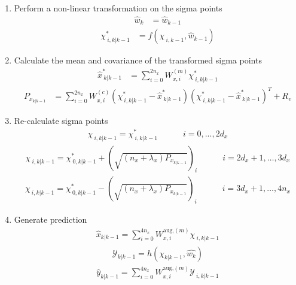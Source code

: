 \begin{enumerate}
    \item Perform a non-linear transformation on the sigma points
    \begin{align*}
        \hat{w}_{k} &= \hat{w}_{k-1} 
        \end{align*}
        \begin{align*}
        \chi^{*}_{\ i,k|k-1} &= f(\chi_{\ i,k-1},\hat{w}_{k-1})
    \end{align*}
    \item Calculate the mean and covariance of the transformed sigma points
    \begin{align*}
        \hat{x}^{*}_{\ k|k-1} &= \sum_{i=0}^{2n_{x}} W^{(m)}_{x,i} \chi^{*}_{\ i, k|k-1} 
        \end{align*}
        \begin{align*}
        P_{x_{k|k-1}} &=  \sum_{i=0}^{2n_{x}} W^{(c)}_{x,i} (\chi^{*}_{\ i, k|k-1} - \hat{x}^{*}_{\ k|k-1})(\chi^{*}_{\ i, k|k-1} - \hat{x}^{*}_{\ k|k-1})^{T} + R_{v} %
    \end{align*}
    \item Re-calculate sigma points
    \begin{align*}
        \chi_{\ i, k|k-1} = \chi^{*}_{\ i,k|k-1} \quad \quad \quad  i=0,...,2d_{x} 
         \end{align*}
         \begin{align*}
        \chi_{\ i, k|k-1} = \chi^{*}_{\ 0,k|k-1} + (\sqrt{(n_{x}+\lambda_{x})P_{x_{k|k-1}}})_{i}  \quad \quad \quad i=2d_{x}+1,\dots,3d_{x} 
         \end{align*}
         \begin{align*}
        \chi_{\ i, k|k-1} = \chi^{*}_{\ 0,k|k-1} - (\sqrt{(n_{x}+\lambda_{x})P_{x_{k|k-1}}})_{i}  \quad \quad \quad  i=3d_{x}+1,\dots,4n_{x}
    \end{align*}
    \item Generate prediction
    \begin{align*}
        \hat{x}_{k|k-1} = \sum_{i=0}^{4n_{x}} W^{\text{aug,}(m)}_{x,i} \chi_{\ i, k|k-1} 
        \end{align*}
         \begin{align*}
        \mathcal{Y}_{k|k-1} = h(\chi_{k|k-1},\hat{w_{k}}) 
        \end{align*}
         \begin{align*}
        \hat{y}_{k|k-1} = \sum_{i=0}^{4n_{x}} W^{\text{aug,}(m)}_{x,i} \mathcal{Y}_{\ i, k|k-1}
    \end{align*}

\end{enumerate}
